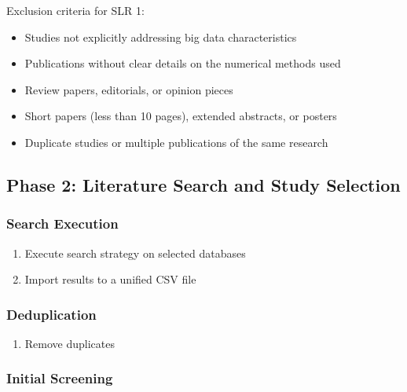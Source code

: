 \documentclass[a4paper,12pt]{article}
\begin{document}
Exclusion criteria for SLR 1:
\begin{itemize}
    \item Studies not explicitly addressing big data characteristics
    \item Publications without clear details on the numerical methods used
    \item Review papers, editorials, or opinion pieces
    \item Short papers (less than 10 pages), extended abstracts, or posters
    \item Duplicate studies or multiple publications of the same research
\end{itemize}
\subsection{Phase 2: Literature Search and Study Selection}

\subsubsection{Search Execution}

\begin{enumerate}
    \item Execute search strategy on selected databases
    \item Import results to a unified CSV file
\end{enumerate}

\subsubsection{Deduplication}

\begin{enumerate}
\item Remove duplicates

\end{enumerate}

\subsubsection{Initial Screening}
\end{document}
